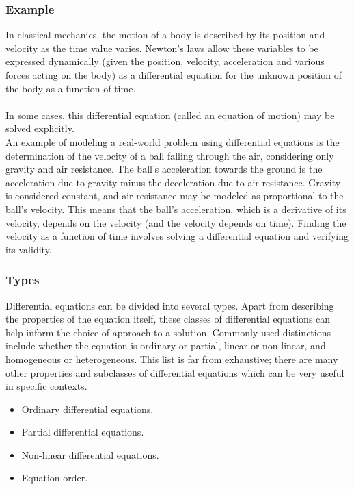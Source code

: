 \documentclass{beamer}
\begin{document}
\begin{frame}[allowframebreaks]
\frametitle {Example}
  In classical mechanics, the motion of a body is described by its position and velocity as the time value varies. 
  Newton's laws allow these variables to be expressed dynamically (given the position, velocity, acceleration and various forces acting on the body) 
  as a differential equation for the unknown position of the body as a function of time.
  \\~\\
  In some cases, this differential equation (called an equation of motion) may be solved explicitly.
  \\\framebreak
  An example of modeling a real-world problem using differential equations is the determination of the velocity of a ball falling through the air, considering only gravity and air resistance. 
  The ball's acceleration towards the ground is the acceleration due to gravity minus the deceleration due to air resistance. Gravity is considered constant, and air resistance may be modeled as proportional to the ball's velocity. 
  This means that the ball's acceleration, which is a derivative of its velocity, depends on the velocity (and the velocity depends on time). Finding the velocity as a function of time involves solving a differential equation and verifying its validity.

\end{frame}

\begin{frame}[allowframebreaks]
\frametitle {Types}
  Differential equations can be divided into several types. Apart from describing the properties of the equation itself, these classes of differential equations can help inform the choice of approach to a solution. 
  Commonly used distinctions include whether the equation is ordinary or partial, linear or non-linear, and homogeneous or heterogeneous. This list is far from exhaustive; 
  there are many other properties and subclasses of differential equations which can be very useful in specific contexts.

  \begin{itemize}
    \item Ordinary differential equations.
    \item Partial differential equations.
    \item Non-linear differential equations.
    \item Equation order.      
    \end{itemize}
\end{frame}
\end{document}
